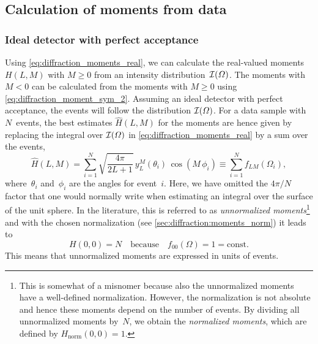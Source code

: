 \subsection{Calculation of moments from data}%
\label{sec:diffraction:moments_data}

\subsubsection{Ideal detector with perfect acceptance}%
\label{sec:diffraction:moments_data_no_acc}

Using \cref{eq:diffraction_moments_real}, we can calculate the
real-valued moments $H(L, M)$ with $M \geq 0$ from an intensity
distribution~$\mathcal{I}(\Omega)$.  The moments with $M < 0$ can be
calculated from the moments with $M \geq 0$ using
\cref{eq:diffraction_moment_sym_2}.  Assuming an ideal detector with
perfect acceptance, the events will follow the distribution
$\mathcal{I}(\Omega)$.  For a data sample with $N$~events, the best
estimates $\hat{H}(L, M)$ for the moments are hence given by replacing
the integral over $\mathcal{I}(\Omega)$ in
\cref{eq:diffraction_moments_real} by a sum over the events,
\ie
\begin{equation}
  \label{eq:diffraction_moments_estimate}
  \hat{H}(L, M)
  = \sum_{i = 1}^N \sqrt{\frac{4 \pi}{2 L + 1}}\, y_L^M(\theta_i)\, \cos(M\, \phi_i)
  \equiv \sum_{i = 1}^N f_{L M}(\Omega_i),
\end{equation}
where~$\theta_i$ and~$\phi_i$ are the angles for event~$i$.  Here, we
have omitted the $4 \pi / N$ factor that one would normally write when
estimating an integral over the surface of the unit sphere.  In the
literature, this is referred to as \emph{unnormalized
moments}\footnote{This is somewhat of a misnomer because also the
unnormalized moments have a well-defined normalization.  However, the
normalization is not absolute and hence these moments depend on the
number of events.  By dividing all unnormalized moments by~$N$, we
obtain the \emph{normalized moments}, which are defined by
$H_\text{norm}(0, 0) = 1$.} and with the chosen normalization (see
\cref{sec:diffraction:moments_norm}) it leads to
\begin{equation}
  \label{eq:diffraction_norm_00}
  H(0, 0)
  = N
  \quad\text{because}\quad
  f_{00}(\Omega)
  = 1
  = \text{const}.
\end{equation}
This means that unnormalized moments are expressed in units of events.

